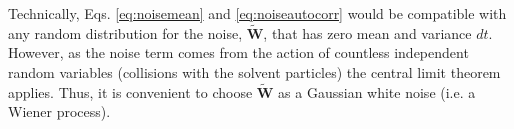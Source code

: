 \documentclass[ twoside,openright,titlepage,numbers=noenddot,%
headinclude,footinclude,cleardoublepage=empty,abstract=on,
BCOR=5mm,paper=b5,fontsize=11pt, dvipsnames
]{scrreprt}
\renewcommand{\vec}[1]{\bm{#1}}
\newcommand{\noise}{\widetilde{W}}
\newcommand{\pvel}{u}
\begin{document}
Technically, Eqs. \eqref{eq:noisemean} and \eqref{eq:noiseautocorr} would be compatible with any random distribution for the noise, $\vec{\noise}$, that has zero mean and variance $dt$. However, as the noise term comes from the action of countless independent random variables (collisions with the solvent particles) the central limit theorem\cite{Feller1968} applies. Thus, it is convenient to choose $\vec{\noise}$ as a Gaussian white noise (i.e. a Wiener process)\cite{dunweg1991}.

%
\end{document}
